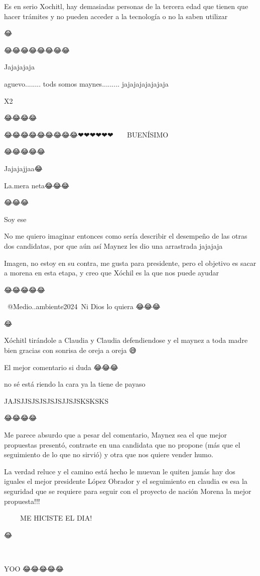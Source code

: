 Es en serio Xochitl, hay demasiadas personas de la tercera edad que tienen que hacer trámites y no pueden acceder a la tecnología o no la saben utilizar

😂

😂😂😂😂😂😂😂😂

Jajajajaja

aguevo........ tods somos maynes......... jajajajajajajaja

X2

😂😂😂😂

😂😂😂😂😂😂😂😂😂❤❤❤❤❤❤🎉🎉🎉🎉🎉🎉🎉BUENÍSIMO

😂😂😂😂😂

Jajajajjaa😂

La.mera neta😂😂😂

😂😂😂

Soy ese

No me quiero imaginar entonces como sería describir el desempeño de las otras dos candidatas, por que aún así Maynez les dio una arrastrada jajajaja

Imagen, no estoy en su contra, me gusta para presidente, pero el objetivo es sacar a morena en esta etapa, y creo que Xóchil es la que nos puede ayudar

😂😂😂😂😂

​ @Medio..ambiente2024 Ni Dios lo quiera 😂😂😂

😂

Xóchitl tirándole a Claudia y Claudia defendiendose y el maynez a toda madre bien gracias con sonrisa de oreja a oreja 😅

El mejor comentario si duda 😂😂😂

no sé está riendo la cara ya la tiene de payaso

JAJSJJSJSJSJSJSJJSJSKSKSKS

😂😂😂😂

Me parece absurdo que a pesar del comentario, Maynez sea el que mejor propuestas presentó, contraste en una candidata que no propone (más que el seguimiento de lo que no sirvió) y otra que nos quiere vender humo.

La verdad reluce y el camino está hecho le muevan le quiten jamás hay dos iguales el mejor presidente López Obrador y el seguimiento en claudia es esa la seguridad que se requiere para seguir con el proyecto de nación Morena la mejor propuesta!!!👋👋👋👋👋👋👋👋👋👋👋👋

🤣🤣🤣🤣🤣🤣🤣 ME HICISTE EL DIA!

😂

🤣

YOO 😂😂😂😂😂

